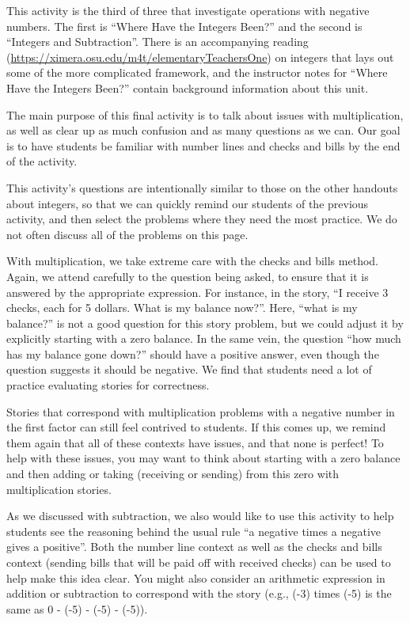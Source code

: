 \documentclass[nooutcomes,noauthor,handout]{ximera}
\begin{document}
\newpage
\begin{instructorNotes}
This activity is the third of three that investigate operations with negative numbers.  The first is ``Where Have the Integers Been?'' and the second is ``Integers and Subtraction''.  There is an accompanying reading (\url{https://ximera.osu.edu/m4t/elementaryTeachersOne}) on integers that lays out some of the more complicated framework, and the instructor notes for ``Where Have the Integers Been?'' contain background information about this unit.

The main purpose of this final activity is to talk about issues with multiplication, as well as clear up as much confusion and as many questions as we can.  Our goal is to have students be familiar with number lines and checks and bills by the end of the activity.

This activity's questions are intentionally similar to those on the other handouts about integers, so that we can quickly remind our students of the previous activity, and then select the problems where they need the most practice.  We do not often discuss all of the problems on this page.

With multiplication, we take extreme care with the checks and bills method.  Again, we attend carefully to the question being asked, to ensure that it is answered by the appropriate expression.  For instance, in the story, ``I receive 3 checks, each for 5 dollars.  What is my balance now?''.  Here, ``what is my balance?'' is not a good question for this story problem, but we could adjust it by explicitly starting with a zero balance.  In the same vein, the question ``how much has my balance gone down?'' should have a positive answer, even though the question suggests it should be negative.  We find that students need a lot of practice evaluating stories for correctness.

Stories that correspond with multiplication problems with a negative number in the first factor can still feel contrived to students.  If this comes up, we remind them again that all of these contexts have issues, and that none is perfect!  To help with these issues, you may want to think about starting with a zero balance and then adding or taking (receiving or sending) from this zero with multiplication stories.  

As we discussed with subtraction, we also would like to use this activity to help students see the reasoning behind the usual rule ``a negative times a negative gives a positive''.  Both the number line context as well as the checks and bills context (sending bills that will be paid off with received checks) can be used to help make this idea clear.  You might also consider an arithmetic expression in addition or subtraction to correspond with the story (e.g., (-3) times (-5) is the same as 0 - (-5) - (-5) - (-5)).


\end{instructorNotes}
\end{document}
